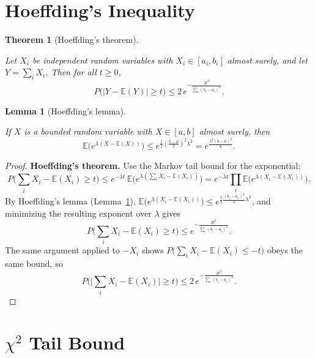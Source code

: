 \documentclass[
  letterpaper,
  DIV=11,
  numbers=noendperiod]{scrreprt}
\theoremstyle{definition}
\theoremstyle{plain}
\newtheorem{theorem}{Theorem}[chapter]
\theoremstyle{plain}
\theoremstyle{definition}
\theoremstyle{plain}
\theoremstyle{plain}
\newtheorem{lemma}{Lemma}[chapter]
\theoremstyle{remark}
\begin{document}
\section{Hoeffding's Inequality}\label{hoeffdings-inequality}

\begin{theorem}[Hoeffding's
theorem]\protect\hypertarget{thm-hoeffding}{}\label{thm-hoeffding}

Let \(X_i\) be independent random variables with \(X_i \in [a_i, b_i]\)
almost surely, and let \(Y = \sum_i X_i\). Then for all \(t \ge 0\), \[
P\big(|Y - \mathbb{E}(Y)| \ge t\big) \le 2\, e^{-\frac{2 t^2}{\sum_i (b_i - a_i)^2}}.
\]

\end{theorem}

\begin{lemma}[Hoeffding's
lemma]\protect\hypertarget{lem-hoeffding}{}\label{lem-hoeffding}

If \(X\) is a bounded random variable with \(X \in [a, b]\) almost
surely, then \[
\mathbb{E}\big(e^{\lambda(X - \mathbb{E}(X))}\big) \le e^{\frac{1}{2}\left(\frac{b-a}{2}\right)^2 \lambda^2} = e^{\frac{\lambda^2 (b-a)^2}{8}}.
\]

\end{lemma}

\begin{proof}
\textbf{Hoeffding's theorem.} Use the Markov tail bound for the
exponential: \[
P\Big(\sum_i X_i - \mathbb{E}(X_i) \ge t\Big) \le e^{-\lambda t}\, \mathbb{E}\Big(e^{\lambda\left(\sum_i X_i - \mathbb{E}(X_i)\right)}\Big)
= e^{-\lambda t} \prod_i \mathbb{E}\big(e^{\lambda(X_i - \mathbb{E}(X_i))}\big).
\] By Hoeffding's lemma (Lemma~\ref{lem-hoeffding}),
\(\mathbb{E}\big(e^{\lambda(X_i - \mathbb{E}(X_i))}\big) \le e^{\frac{1}{2}\frac{(b_i - a_i)^2}{4}\lambda^2}\),
and minimizing the resulting exponent over \(\lambda\) gives \[
P\Big(\sum_i X_i - \mathbb{E}(X_i) \ge t\Big) \le e^{-\frac{2 t^2}{\sum_i (b_i - a_i)^2}}.
\] The same argument applied to \(-X_i\) shows
\(P\big(\sum_i X_i - \mathbb{E}(X_i) \le -t\big)\) obeys the same bound,
so \[
P\Big(\big|\textstyle\sum_i X_i - \mathbb{E}(X_i)\big| \ge t\Big) \le 2\, e^{-\frac{2 t^2}{\sum_i (b_i - a_i)^2}}.
\]
\end{proof}

\section{\texorpdfstring{\(\chi^2\) Tail
Bound}{\textbackslash chi\^{}2 Tail Bound}}\label{chi2-tail-bound}
\end{document}
